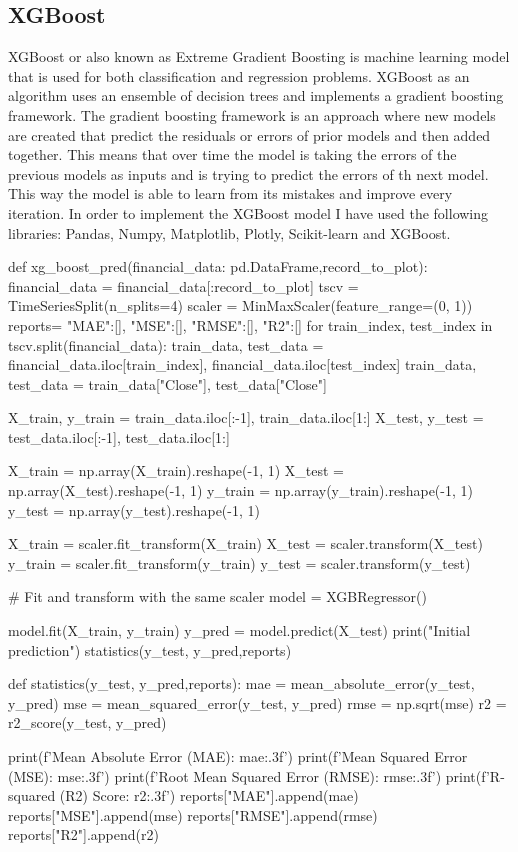 \documentclass{imc-inf}
\begin{document}
	\subsection{XGBoost}
	XGBoost or also known as Extreme Gradient Boosting is machine learning model that is used for both classification and regression problems. XGBoost as an algorithm uses an ensemble of decision trees
	and implements a gradient boosting framework. The gradient boosting framework is an approach where new models are created that predict the residuals or errors of prior models and then added together.
	This means that over time the model is taking the errors of the previous models as inputs and is trying to predict the errors of th next model. This way the model is able to learn from its mistakes and improve every
	iteration. In order to implement the XGBoost model \cite{xgboost_implement} I have used the following libraries: Pandas, Numpy, Matplotlib, Plotly, Scikit-learn and XGBoost. 
	\begin{code}[language=Python, caption={XGBoost Model Building}]
		def xg_boost_pred(financial_data: pd.DataFrame,record_to_plot):
			financial_data = financial_data[:record_to_plot]
			tscv = TimeSeriesSplit(n_splits=4)
			scaler = MinMaxScaler(feature_range=(0, 1))
			reports= {
				"MAE":[],
				"MSE":[],
				"RMSE":[],
				"R2":[]
			}
			for train_index, test_index in tscv.split(financial_data):
			train_data, test_data = financial_data.iloc[train_index], financial_data.iloc[test_index]
			train_data, test_data = train_data["Close"], test_data["Close"]
			
			
			X_train, y_train = train_data.iloc[:-1], train_data.iloc[1:]
			X_test, y_test = test_data.iloc[:-1], test_data.iloc[1:]
			
			X_train = np.array(X_train).reshape(-1, 1)
			X_test = np.array(X_test).reshape(-1, 1)
			y_train = np.array(y_train).reshape(-1, 1)
			y_test = np.array(y_test).reshape(-1, 1)
			
			X_train = scaler.fit_transform(X_train)
			X_test = scaler.transform(X_test)
			y_train = scaler.fit_transform(y_train)
			y_test = scaler.transform(y_test)
			
			# Fit and transform with the same scaler
			model = XGBRegressor()
			
			
			model.fit(X_train, y_train)
			y_pred = model.predict(X_test)
			print("Initial prediction")
			statistics(y_test, y_pred,reports)
			
			def statistics(y_test, y_pred,reports):
			mae = mean_absolute_error(y_test, y_pred)
			mse = mean_squared_error(y_test, y_pred)
			rmse = np.sqrt(mse)
			r2 = r2_score(y_test, y_pred)
			
			print(f'Mean Absolute Error (MAE): {mae:.3f}')
			print(f'Mean Squared Error (MSE): {mse:.3f}')
			print(f'Root Mean Squared Error (RMSE): {rmse:.3f}')
			print(f'R-squared (R2) Score: {r2:.3f}')
			reports["MAE"].append(mae)
			reports["MSE"].append(mse)
			reports["RMSE"].append(rmse)
			reports["R2"].append(r2)
		
		
	\end{code}
\end{document}
